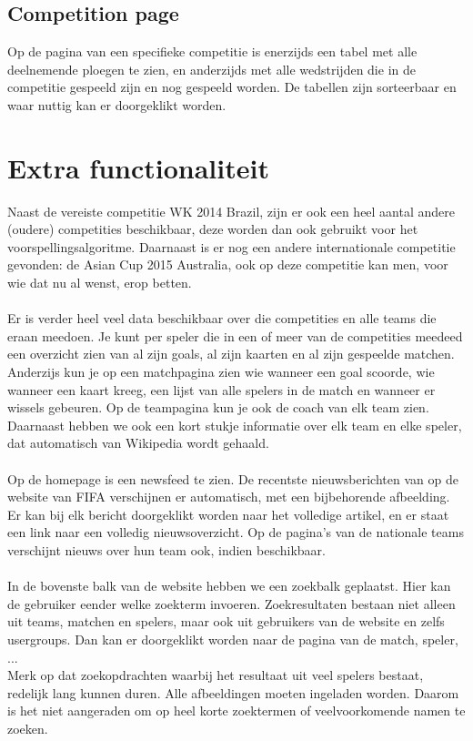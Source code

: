 \documentclass[11pt, a4paper]{article}
\begin{document}
\subsection{Competition page}
Op de pagina van een specifieke competitie is enerzijds een tabel met alle deelnemende ploegen te zien, en anderzijds met alle wedstrijden die in de competitie gespeeld zijn en nog gespeeld worden. De tabellen zijn sorteerbaar en waar nuttig kan er doorgeklikt worden.

\section{Extra functionaliteit}
Naast de vereiste competitie WK 2014 Brazil, zijn er ook een heel aantal andere (oudere) competities beschikbaar, deze worden dan ook gebruikt voor het voorspellingsalgoritme. Daarnaast is er nog een andere internationale competitie gevonden: de Asian Cup 2015 Australia, ook op deze competitie kan men, voor wie dat nu al wenst, erop betten. \\ \\
Er is verder heel veel data beschikbaar over die competities en alle teams die eraan meedoen. Je kunt per speler die in een of meer van de competities meedeed een overzicht zien van al zijn goals, al zijn kaarten en al zijn gespeelde matchen. Anderzijs kun je op een matchpagina zien wie wanneer een goal scoorde, wie wanneer een kaart kreeg, een lijst van alle spelers in de match en wanneer er wissels gebeuren. Op de teampagina kun je ook de coach van elk team zien. Daarnaast hebben we ook een kort stukje informatie over elk team en elke speler, dat automatisch van Wikipedia wordt gehaald. \\ \\
Op de homepage is een newsfeed te zien. De recentste nieuwsberichten van op de website van FIFA verschijnen er automatisch, met een bijbehorende afbeelding. Er kan bij elk bericht doorgeklikt worden naar het volledige artikel, en er staat een link naar een volledig nieuwsoverzicht. Op de pagina's van de nationale teams verschijnt nieuws over hun team ook, indien beschikbaar. \\ \\
In de bovenste balk van de website hebben we een zoekbalk geplaatst. Hier kan de gebruiker eender welke zoekterm invoeren. Zoekresultaten bestaan niet alleen uit teams, matchen en spelers, maar ook uit gebruikers van de website en zelfs usergroups. Dan kan er doorgeklikt worden naar de pagina van de match, speler, ... \\ Merk op dat zoekopdrachten waarbij het resultaat uit veel spelers bestaat, redelijk lang kunnen duren. Alle afbeeldingen moeten ingeladen worden. Daarom is het niet aangeraden om op heel korte zoektermen of veelvoorkomende namen te zoeken. \\ \\
\end{document}
